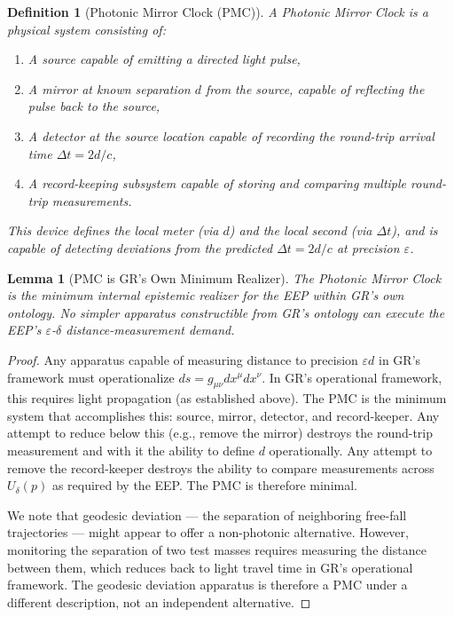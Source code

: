 \documentclass[11pt,a4paper]{article}
\newtheorem{definition}{Definition}
\newtheorem{lemma}{Lemma}
\begin{document}
\begin{definition}[Photonic Mirror Clock (PMC)]
\label{def:pmc}
A \emph{Photonic Mirror Clock} is a physical system consisting of:
\begin{enumerate}[label=(\roman*)]
\item A source capable of emitting a directed light pulse,
\item A mirror at known separation $d$ from the source, capable of reflecting
      the pulse back to the source,
\item A detector at the source location capable of recording the round-trip
      arrival time $\Delta t = 2d/c$,
\item A record-keeping subsystem capable of storing and comparing multiple
      round-trip measurements.
\end{enumerate}
This device defines the local meter (via $d$) and the local second (via $\Delta t$),
and is capable of detecting deviations from the predicted $\Delta t = 2d/c$ at
precision $\varepsilon$.
\end{definition}

\begin{lemma}[PMC is GR's Own Minimum Realizer]
\label{lem:pmc}
The Photonic Mirror Clock is the minimum internal epistemic realizer for the EEP
within GR's own ontology. No simpler apparatus constructible from GR's ontology
can execute the EEP's $\varepsilon$-$\delta$ distance-measurement demand.
\end{lemma}

\begin{proof}
Any apparatus capable of measuring distance to precision $\varepsilon d$ in GR's
framework must operationalize $ds = g_{\mu\nu}dx^\mu dx^\nu$. In GR's operational
framework, this requires light propagation (as established above). The PMC is the
minimum system that accomplishes this: source, mirror, detector, and record-keeper.
Any attempt to reduce below this (e.g., remove the mirror) destroys the round-trip
measurement and with it the ability to define $d$ operationally. Any attempt to
remove the record-keeper destroys the ability to compare measurements across
$U_\delta(p)$ as required by the EEP. The PMC is therefore minimal.

We note that geodesic deviation --- the separation of neighboring free-fall
trajectories --- might appear to offer a non-photonic alternative. However, monitoring
the separation of two test masses requires measuring the distance between them, which
reduces back to light travel time in GR's operational framework. The geodesic deviation
apparatus is therefore a PMC under a different description, not an independent
alternative.
\end{proof}
\end{document}
